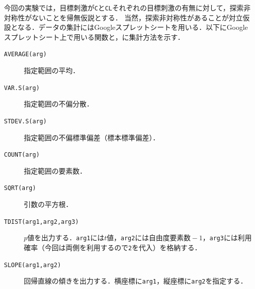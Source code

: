 今回の実験では，目標刺激が\texttt{C}と\texttt{CL}それぞれの目標刺激の有無に対して，探索非対称性がないことを帰無仮説とする．
当然，探索非対称性があることが対立仮設となる．データの集計にはGoogleスプレットシートを用いる．以下にGoogleスプレットシート上で用いる関数と，に集計方法を示す．
\begin{multicols}{2}
    \begin{description}
        \item[\texttt{AVERAGE(arg)}] 指定範囲の平均．
        \item[\texttt{VAR.S(arg)}] 指定範囲の不偏分散．
        \item[\texttt{STDEV.S(arg)}] 指定範囲の不偏標準偏差（標本標準偏差）．
        \item[\texttt{COUNT(arg)}] 指定範囲の要素数．
        \item[\texttt{SQRT(arg)}] 引数の平方根．
        \item[\texttt{TDIST(arg1,arg2,arg3)}] \(p\)値を出力する．\texttt{arg1}には\(t\)値，\texttt{arg2}には自由度\(\textrm{要素数}-1\)，\texttt{arg3}には利用確率（今回は両側を利用するので\texttt{2}を代入）を格納する．
        \item[\texttt{SLOPE(arg1,arg2)}] 回帰直線の傾きを出力する．横座標に\texttt{arg1}，縦座標に\texttt{arg2}を指定する．
    \end{description}
\end{multicols}
